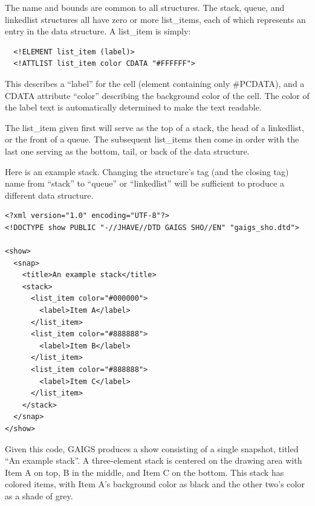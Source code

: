 \documentclass[11pt,letterpaper]{book}
\begin{document}
  The name and bounds are common to all structures.  The stack, queue,
  and linkedlist structures all have zero or more list\_items, each of
  which represents an entry in the data structure. A list\_item is
  simply:

\footnotesize \begin{verbatim}
  <!ELEMENT list_item (label)>
  <!ATTLIST list_item color CDATA "#FFFFFF">
\end{verbatim} \normalsize
  
  This describes a ``label'' for the cell (element containing only
  \#PCDATA), and a CDATA attribute ``color'' describing the background
  color of the cell.  The color of the label text is automatically
  determined to make the text readable.

The list\_item given first will serve as the top of a stack, the head
of a linkedlist, or the front of a queue. The subsequent list\_items
then come in order with the last one serving as the bottom, tail, or
back of the data structure.

Here is an example stack. Changing the structure's tag (and the
closing tag) name from ``stack'' to ``queue'' or ``linkedlist'' will
be sufficient to produce a different data structure.

\footnotesize \begin{verbatim}
<?xml version="1.0" encoding="UTF-8"?>
<!DOCTYPE show PUBLIC "-//JHAVE//DTD GAIGS SHO//EN" "gaigs_sho.dtd">

<show>
  <snap>
    <title>An example stack</title>
    <stack>
      <list_item color="#000000">
        <label>Item A</label>
      </list_item>
      <list_item color="#888888">
        <label>Item B</label>
      </list_item>
      <list_item color="#888888">
        <label>Item C</label>
      </list_item>
    </stack>
  </snap>
</show> 
\end{verbatim} \normalsize

Given this code, GAIGS produces a show consisting of a single
snapshot, titled ``An example stack''. A three-element stack is
centered on the drawing area with Item A on top, B in the middle, and
Item C on the bottom. This stack has colored items, with Item A's
background color as black and the other two's color as a shade of
grey.
\end{document}
